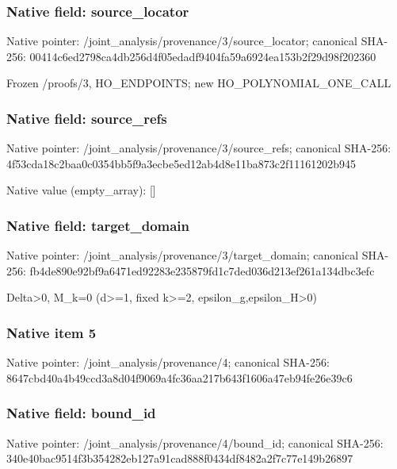 \documentclass[10pt,a4paper]{article}
\begin{document}
\subsubsection{Native field: source\_\allowbreak{}locator}
Native pointer: /joint\_\allowbreak{}analysis/provenance/3/source\_\allowbreak{}locator; canonical SHA-256: 00414c6ed2798ca4db256d4f05edadf9404fa59a6924ea153b2f29d98f202360

\begingroup\raggedright\sloppy Frozen /\allowbreak{}proofs/\allowbreak{}3,\allowbreak{} HO\_\allowbreak{}ENDPOINTS;\allowbreak{} new HO\_\allowbreak{}POLYNOMIAL\_\allowbreak{}ONE\_\allowbreak{}CALL\par\endgroup

\subsubsection{Native field: source\_\allowbreak{}refs}
Native pointer: /joint\_\allowbreak{}analysis/provenance/3/source\_\allowbreak{}refs; canonical SHA-256: 4f53cda18c2baa0c0354bb5f9a3ecbe5ed12ab4d8e11ba873c2f11161202b945

Native value (empty\_\allowbreak{}array): []

\subsubsection{Native field: target\_\allowbreak{}domain}
Native pointer: /joint\_\allowbreak{}analysis/provenance/3/target\_\allowbreak{}domain; canonical SHA-256: fb4de890e92bf9a6471ed92283e235879fd1c7ded036d213ef261a134dbc3efc

\begingroup\raggedright\sloppy Delta>0,\allowbreak{} M\_\allowbreak{}k=\allowbreak{}0 (d>=\allowbreak{}1,\allowbreak{} fixed k>=\allowbreak{}2,\allowbreak{} epsilon\_\allowbreak{}g,\allowbreak{}epsilon\_\allowbreak{}H>0)\par\endgroup

\subsubsection{Native item 5}
Native pointer: /joint\_\allowbreak{}analysis/provenance/4; canonical SHA-256: 8647cbd40a4b49ccd3a8d04f9069a4fc36aa217b643f1606a47eb94fe26e39c6

\subsubsection{Native field: bound\_\allowbreak{}id}
Native pointer: /joint\_\allowbreak{}analysis/provenance/4/bound\_\allowbreak{}id; canonical SHA-256: 340e40bac9514f3b354282eb127a91cad888f0434df8482a2f7c77e149b26897
\end{document}
